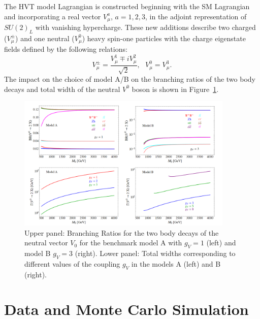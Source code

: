 The HVT model Lagrangian is constructed beginning with the SM Lagrangian and incorporating a real vector $V_\mu^a$, $a=1,2,3$, in the adjoint representation of $SU(2)_L$ with vanishing hypercharge.
These new additions describe two charged ($V_\mu^\pm$) and one neutral ($V_\mu^0$) heavy spin-one particles with the charge eigenstate fields defined by the following relations:
\begin{equation}
V_\mu^\pm = \frac{V_\mu^1 \mp iV_\mu^2}{\sqrt{2}},\ \ \ V_\mu^0 = V_\mu^3.
\end{equation}
The impact on the choice of model A/B on the branching ratios of the two body decays and total width of the neutral $V^0$ boson is shown in Figure~\ref{fig:hvt_br_models}.

\begin{figure}
	\centering
	\includegraphics[width=0.92\textwidth,origin=c]{hvt_br_models}
	\caption{
	Upper  panel: Branching  Ratios  for  the  two  body  decays  of  the  neutral  vector $V_0$ for the benchmark model A with $g_V=1$ (left) and model B $g_V=3$ (right).
	Lower panel: Total widths corresponding to different values of the coupling $g_V$ in the models A (left) and B (right).
	\cite{Pappadopulo:2014qza}
	}
	\label{fig:hvt_br_models}
\end{figure}

\section{Data and Monte Carlo Simulation}
\label{sec:samples}


